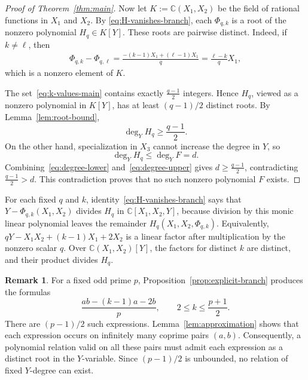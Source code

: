 \documentclass[reqno, 12pt]{article}
\numberwithin{equation}{section}
\theoremstyle{definition}
\newtheorem{remark}[theorem]{Remark}
\newcommand{\CC}{\mathbb{C}}
\begin{document}
\begin{proof}[Proof of Theorem~\ref{thm:main}]
Now let $K:=\CC(X_1,X_2)$ be the field of rational functions in $X_1$ and $X_2$.  By
\cref{eq:H-vanishes-branch}, each $\Phi_{q,k}$ is a root of the nonzero
polynomial $H_q\in K[Y]$.  These roots are pairwise distinct.  Indeed, if
$k\neq\ell$, then
\begin{align*}
\Phi_{q,k}-\Phi_{q,\ell}=\frac{-(k-1)X_1+(\ell-1)X_1}{q}=\frac{\ell-k}{q}X_1,
\end{align*}
which is a nonzero element of $K$.

The set~\cref{eq:k-values-main} contains exactly $\frac{q-1}{2}$ integers.  Hence $H_q$, viewed as a nonzero polynomial in $K[Y]$, has at least $(q-1)/2$ distinct roots.  By Lemma~\ref{lem:root-bound},
\begin{equation}\label{eq:degree-lower}
  \deg_Y H_q\ge\frac{q-1}{2}.
\end{equation}
On the other hand, specialization in $X_3$ cannot increase the degree in
$Y$, so
\begin{equation}\label{eq:degree-upper}
  \deg_Y H_q\le\deg_Y F=d.
\end{equation}
Combining~\cref{eq:degree-lower} and~\cref{eq:degree-upper} gives $d\ge\frac{q-1}{2}$, contradicting~$\frac{q-1}{2}>d$.  This contradiction proves that no such nonzero polynomial $F$ exists.
\end{proof}

For each fixed $q$ and $k$, identity~\cref{eq:H-vanishes-branch} says that $Y-\Phi_{q,k}(X_1,X_2)$ divides $H_q$ in
$\CC[X_1,X_2,Y]$, because division by this monic linear polynomial leaves the remainder $H_q(X_1,X_2,\Phi_{q,k})$.  Equivalently, $qY-X_1X_2+(k-1)X_1+2X_2$ is a linear factor after multiplication by the nonzero scalar $q$.
Over $\CC(X_1,X_2)[Y]$, the factors for distinct $k$ are distinct, and their product divides $H_q$. 

\begin{remark}
For a fixed odd prime $p$, Proposition~\ref{prop:explicit-branch} produces the
formulas
\[\frac{ab-(k-1)a-2b}{p},\qquad2\le k\le\frac{p+1}{2}.
\]
There are $(p-1)/2$ such expressions.  Lemma~\ref{lem:approximation} shows
that each expression occurs on infinitely many coprime pairs $(a,b)$.  Consequently, a polynomial relation valid on
all these pairs must admit each expression as a distinct root in the
$Y$-variable.  Since $(p-1)/2$ is unbounded, no relation of fixed $Y$-degree
can exist.
\end{remark}
\end{document}
